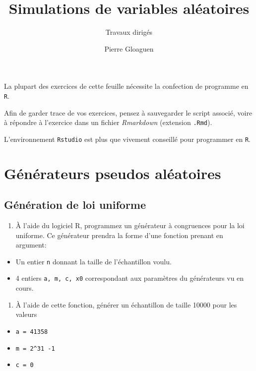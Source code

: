 \documentclass[]{article}
\title{Simulations de variables aléatoires}
\subtitle{Travaux dirigés}
\author{Pierre Gloaguen}
\date{}
\providecommand{\tightlist}{%
  \setlength{\itemsep}{0pt}\setlength{\parskip}{0pt}}
\begin{document}
\maketitle

La plupart des exercices de cette feuille nécessite la confection de
programme en \texttt{R}.

Afin de garder trace de vos exercices, pensez à sauvegarder le script
associé, voire à répondre à l'exercice dans un fichier \emph{Rmarkdown}
(extension \texttt{.Rmd}).

L'environnement \texttt{Rstudio} est plus que vivement conseillé pour
programmer en \texttt{R}.

\hypertarget{guxe9nuxe9rateurs-pseudos-aluxe9atoires}{%
\section{Générateurs pseudos
aléatoires}\label{guxe9nuxe9rateurs-pseudos-aluxe9atoires}}

\hypertarget{guxe9nuxe9ration-de-loi-uniforme}{%
\subsection{Génération de loi
uniforme}\label{guxe9nuxe9ration-de-loi-uniforme}}

\begin{enumerate}
\def\labelenumi{\arabic{enumi}.}
\tightlist
\item
  À l'aide du logiciel R, programmez un générateur à congruences pour la
  loi uniforme. Ce générateur prendra la forme d'une fonction prenant en
  argument:
\end{enumerate}

\begin{itemize}
\tightlist
\item
  Un entier \texttt{n} donnant la taille de l'échantillon voulu.
\item
  4 entiers \texttt{a,\ m,\ c,\ x0} correspondant aux paramètres du
  générateurs vu en cours.
\end{itemize}

\begin{enumerate}
\def\labelenumi{\arabic{enumi}.}
\setcounter{enumi}{1}
\tightlist
\item
  À l'aide de cette fonction, générer un échantillon de taille 10000
  pour les valeurs
\end{enumerate}

\begin{itemize}
\tightlist
\item
  \texttt{a\ =\ 41358}
\item
  \texttt{m\ =\ 2\^{}31\ -1}
\item
  \texttt{c\ =\ 0}
\end{itemize}
\end{document}
